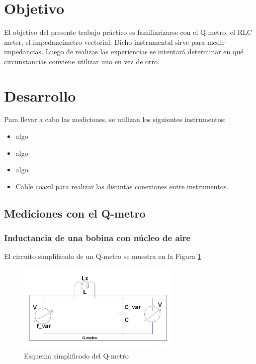 \documentclass[a4paper,10pt]{article}
\title{  }
\begin{document}
	\maketitle %
	\newpage

	\tableofcontents %
	\newpage


	\section{Objetivo}
	
	\indent	El objetivo del presente trabajo práctico es familiarizarse con 
	el Q-metro, el RLC meter, el impedancímetro vectorial. Dicho instrumental
	sirve para medir impedancias. Luego de realizas las experiencias se 
	intentará determinar en qué circunstancias conviene utilizar uno en vez 
	de otro.

	\newpage
	\section{Desarrollo}
	
	\indent Para llevar a cabo las mediciones, se utilizan los siguientes 
	instrumentos:
		\begin{itemize}
			\item algo
			\item algo
			\item algo
			\item Cable coaxil para realizar las distintas conexiones entre 
			instrumentos.
		\end{itemize}	
	
		\subsection{Mediciones con el Q-metro}
		\subsubsection{Inductancia de una bobina con n\'ucleo de aire}
		
		\indent El circuito simplificado de un Q-metro se muestra en la Figura
		\ref{img001}

			\begin{figure}[!htb]
				\centering
				\includegraphics[width=8cm]
				{Imagenes/qmetro.png}
				\caption{Esquema simplificado del Q-metro}
				\label{img001} 
			\end{figure}
\end{document}
